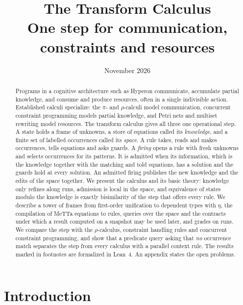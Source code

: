 \documentclass[11pt]{article}
\title{The Transform Calculus\\[2pt]
\large One step for communication, constraints and resources}
\author{}
\date{November 2026}
\theoremstyle{plain}
\theoremstyle{definition}
\theoremstyle{remark}
\begin{document}
\maketitle

\begin{abstract}
Programs in a cognitive architecture such as Hyperon communicate, accumulate partial
knowledge, and consume and produce resources, often in a single indivisible action. Established
calculi specialize: the $\pi$- and $\rho$-calculi model communication, concurrent constraint
programming models partial knowledge, and Petri nets and multiset rewriting model resources.
The transform calculus gives all three one operational step. A state holds a frame of unknowns,
a store of equations called its \emph{knowledge}, and a finite set of labelled occurrences called
its \emph{space}. A rule takes, reads and makes occurrences, tells equations and asks guards. A
\emph{firing} opens a rule with fresh unknowns and selects occurrences for its patterns. It is
admitted when its information, which is the knowledge together with the matching and told
equations, has a solution and the guards hold at every solution. An admitted firing publishes
the new knowledge and the edits of the space together.
We present the calculus and its basic theory: knowledge only refines along runs, admission is
local in the space, and equivalence of states modulo the knowledge is exactly bisimilarity of the
step that offers every rule.
We describe a tower of frames from first-order unification to dependent types with $\eta$, the
compilation of MeTTa equations to rules, queries over the space and the contracts under which
a result computed on a snapshot may be used later, and grades on runs. We compare the step with
the $\rho$-calculus, constraint handling rules and concurrent constraint programming, and show
that a predicate query asking that \emph{no} occurrence match separates the step from every
calculus with a parallel context rule. The results marked in footnotes are formalized in Lean~4.
An appendix states the open problems.
\end{abstract}

\tableofcontents

\section{Introduction}\label{sec:intro}
\end{document}
